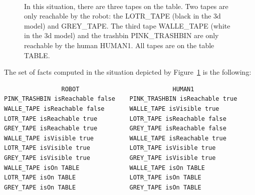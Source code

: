 \documentclass[preprint,5p]{elsarticle}
\begin{document}
\begin{figure}[ht!]
   \begin{center}
%
       \\ %
%
   \end{center}

   \caption{%
     In this situation, there are three tapes on the table. Two tapes
     are only reachable by the robot: the LOTR\_TAPE (black in the 3d
     model) and GREY\_TAPE. The third tape WALLE\_TAPE (white in the
     3d model) and the trashbin PINK\_TRASHBIN are only reachable by
     the human HUMAN1. All tapes are on the table TABLE.  }%
   \label{fig:sparkSubfigures}

\end{figure}

The set of facts computed in the situation depicted by
Figure~\ref{fig:sparkSubfigures} is the following:
\begin{footnotesize}
\begin{verbatim}
                ROBOT                          HUMAN1
PINK_TRASHBIN isReachable false    PINK_TRASHBIN isReachable true 
WALLE_TAPE isReachable false       WALLE_TAPE isVisible true 
LOTR_TAPE isReachable true         LOTR_TAPE isReachable false 
GREY_TAPE isReachable true         GREY_TAPE isReachable false
WALLE_TAPE isVisible true          WALLE_TAPE isReachable true 
LOTR_TAPE isVisible true           LOTR_TAPE isVisible true 
GREY_TAPE isVisible true           GREY_TAPE isVisible true 
WALLE_TAPE isOn TABLE              WALLE_TAPE isOn TABLE 
LOTR_TAPE isOn TABLE               LOTR_TAPE isOn TABLE 
GREY_TAPE isOn TABLE               GREY_TAPE isOn TABLE 
\end{verbatim}
\end{footnotesize}
\end{document}
